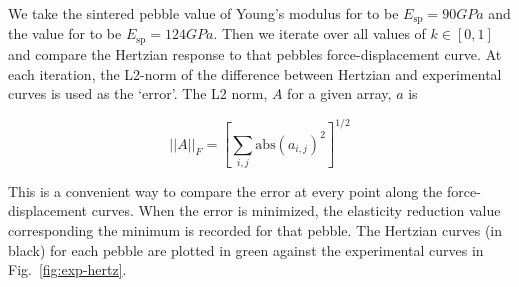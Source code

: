 We take the sintered pebble value of Young's modulus for \lis to be $E_\text{sp} = \si{90 GPa}$ and the value for \lit to be $E_\text{sp}= \si{124 GPa}$. Then we iterate over all values of $k\in[0,1]$ and compare the Hertzian response to that pebbles force-displacement curve. At each iteration, the L2-norm of the difference between Hertzian and experimental curves is used as the `error'. The L2 norm, $A$ for a given array, $a$ is 

\begin{equation}
||A||_F = \left[\sum_{i,j}\textrm{abs}(a_{i,j})^2\right]^{1/2}
\end{equation}

This is a convenient way to compare the error at every point along the force-displacement curves. When the error is minimized, the elasticity reduction value corresponding the minimum is recorded for that pebble. The Hertzian curves (in black) for each pebble are plotted in green against the experimental curves in Fig.~\ref{fig:exp-hertz}. 





